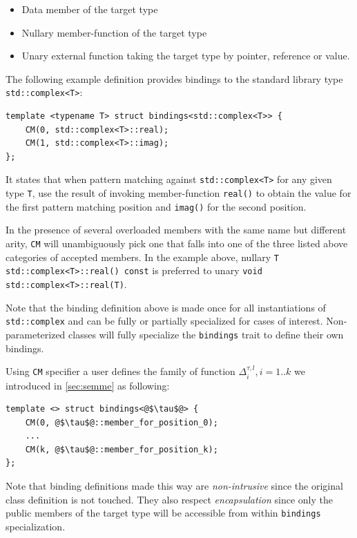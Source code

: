 \documentclass[preprint]{sigplanconf}
\makeatletter
\DeclareRobustCommand{\code}[1]{{\lstinline[breaklines=false,escapechar=@]{#1}}}
\makeatother
\begin{document}
\begin{itemize}
\item Data member of the target type
\item Nullary member-function of the target type
\item Unary external function taking the target type by pointer, reference or value.
\end{itemize}

\noindent
The following example definition provides bindings to the standard library type 
\code{std::complex<T>}:

\begin{lstlisting}[keepspaces,columns=flexible]
template <typename T> struct bindings<std::complex<T>> {
    CM(0, std::complex<T>::real); 
    CM(1, std::complex<T>::imag); 
};
\end{lstlisting}

\noindent
It states that when pattern matching against \code{std::complex<T>} for any 
given type \code{T}, use the result of invoking member-function \code{real()} to 
obtain the value for the first pattern matching position and \code{imag()} for 
the second position. 

In the presence of several overloaded members with the same name but different 
arity, \code{CM} will unambiguously pick one that falls into one of the three 
listed above categories of accepted members. In the example above, nullary 
\code{T std::complex<T>::real() const} is preferred to unary 
\code{void std::complex<T>::real(T)}.

Note that the binding definition above is made once for all instantiations of 
\code{std::complex} and can be fully or partially specialized for cases of 
interest. Non-parameterized classes will fully specialize the \code{bindings} 
trait to define their own bindings.

Using \code{CM} specifier a user defines the family of function 
$\Delta_i^{\tau,l},i=1..k$ we introduced in \textsection\ref{sec:semme} as 
following:

\begin{lstlisting}
template <> struct bindings<@$\tau$@> {
    CM(0, @$\tau$@::member_for_position_0); 
    ...
    CM(k, @$\tau$@::member_for_position_k); 
};
\end{lstlisting}

Note that binding definitions made this way are \emph{non-intrusive} since the 
original class definition is not touched. They also respect \emph{encapsulation} 
since only the public members of the target type will be accessible from within 
\code{bindings} specialization.
\end{document}
